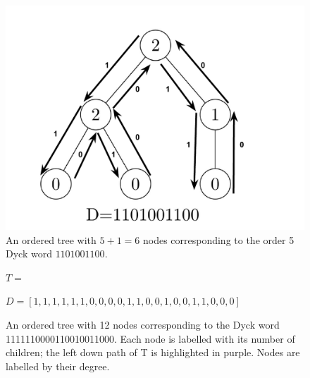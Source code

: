 \begin{figure}
    \centering
    \includegraphics{Ordered-Tree-Bijection-Illustration}
    \caption{An ordered tree with $5+1=6$ nodes corresponding to the order 5 Dyck word $1101001100$.}
    \label{ordered_tree_bijection_illustration}
\end{figure}


\begin{figure}
    $T=$


    $D=[1, 1, 1, 1, 1, 1, 0, 0, 0, 0, 1, 1, 0, 0, 1, 0, 0, 1, 1, 0, 0, 0]$
    \caption{An ordered tree with 12 nodes corresponding to the Dyck word 1111110000110010011000.  Each node is labelled with its number of children; the left down path of T is highlighted in purple. Nodes are labelled by their degree.}
    \label{exampleotree}
\end{figure}

